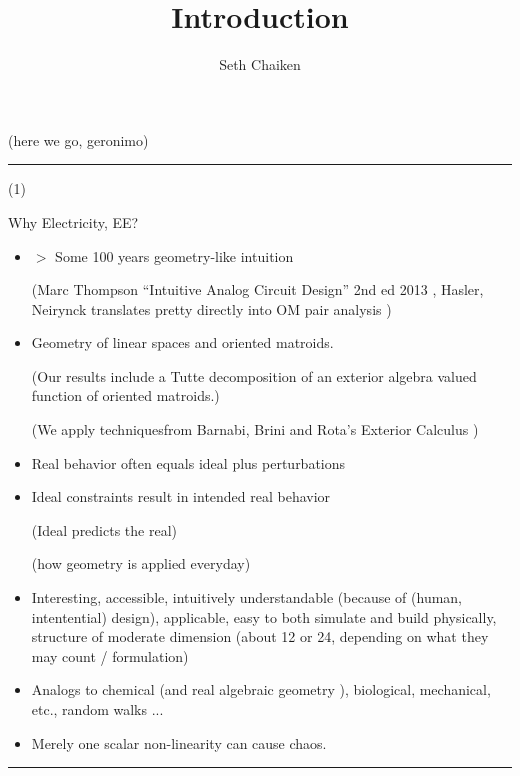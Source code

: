 \documentclass{article}
\title{Introduction}
\author{Seth Chaiken}
\begin{document}
\maketitle

(here we go, geronimo)


\rule{\textwidth}{3pt}
(1)








Why Electricity, EE?
\begin{itemize}
\item $>$ Some 100 years geometry-like intuition

(Marc Thompson ``Intuitive Analog Circuit Design'' 2nd ed 2013
\cite{intuitAna}, Hasler, Neirynck translates pretty directly into
OM pair analysis \cite{HaslerNeirynck})


\item Geometry of linear spaces and oriented matroids.

(Our results include a Tutte decomposition of an exterior algebra
valued function of oriented matroids.)

(We apply techniquesfrom Barnabi, Brini and Rota's Exterior Calculus 
\cite{exteriorCalc})

\item
Real behavior often equals ideal plus perturbations

\item
Ideal constraints result in intended real behavior

(Ideal predicts the real)

(how geometry is applied everyday)

\item 
Interesting, accessible, intuitively understandable
(because of (human, intentential) design), applicable,
easy to both simulate and build physically, structure of moderate
dimension (about 12 or 24, depending on what they may count / formulation)
\item
Analogs to chemical (and real algebraic geometry 
\cite{signsInChemRAG}), biological, mechanical, etc., random walks ...



\item
Merely one scalar non-linearity can cause chaos.
\end{itemize}
\rule{\textwidth}{3pt}
\end{document}
